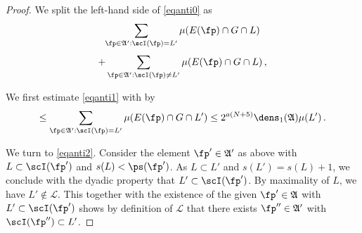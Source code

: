 \begin{proof}
We split the left-hand side of \eqref{eqanti0} as
\begin{equation}\label{eqanti1}
    \sum_{\fp\in\mathfrak{A}':\scI(\fp)=L'}\mu(E(\fp)\cap G\cap L)
\end{equation}
\begin{equation}\label{eqanti2}
    +
     \sum_{\fp\in\mathfrak{A}':\scI(\fp)\neq L'}\mu(E(\fp)\cap G\cap L)\, ,
\end{equation}

We first estimate \eqref{eqanti1}
with  by
\begin{equation}\label{equanti1.5}
    \le \sum_{\fp\in\mathfrak{A}':\scI(\fp)=L'}\mu(E(\fp)\cap G\cap L')\le 2^{a(N+5)}\dens_1(\mathfrak{A})\mu(L')\, .
\end{equation}



We turn to \eqref{eqanti2}.
Consider the element $\fp'\in \mathfrak{A}'$ as above
with $L\subset \scI(\fp')$ and $s(L)<\ps(\fp')$.
As $L\subset L'$ and $s(L')=s(L)+1$, we conclude with the dyadic property that $L'\subset \scI(\fp')$.
By maximality of $L$, we have
$L'\not\in \mathcal{L}$.
This together with the existence of the given $\fp'\in \mathfrak{A}$
with $L'\subset \scI(\fp')$
shows by definition of $\mathcal{L}$ that there exists $\fp''\in \mathfrak{A}'$ with
$\scI(\fp'')\subset L'$.





\end{proof}
